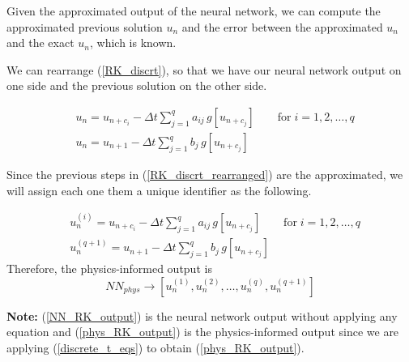 \documentclass[a4paper,12pt]{article}
\theoremstyle{definition}
\begin{document}
Given the approximated output of the neural network, we can compute the ap\-prox\-i\-mat\-ed previous solution 
$u_{n}$ and the error between the approximated $u_n$ and the exact $u_n$, which is known.

We can rearrange (\ref{RK_discrt}), so that we have our neural network output on one side and the 
previous solution on the other side.

\begin{equation}\label{RK_discrt_rearranged}
\begin{aligned}
& u_n = u_{n+c_i} -  \Delta t \sum_{j=1}^{q} a_{ij} \, g[u_{n+c_j}] 
\qquad \text{for} \; i = 1, 2, \dots, q \\
& u_n = u_{n+1} - \Delta t \sum_{j=1}^{q} b_j \, g[u_{n+c_j}] 
\end{aligned}
\end{equation}

Since the previous steps in (\ref{RK_discrt_rearranged}) are the approximated, we will assign each one 
them a unique identifier as the following.

\begin{equation}\label{discrete_t_eqs}
\begin{aligned}
& u_n^{(i)} = u_{n+c_i} -  \Delta t \sum_{j=1}^{q} a_{ij} \, g[u_{n+c_j}] 
\qquad \text{for} \; i = 1, 2, \dots, q \\
& u_n^{(q+1)} = u_{n+1} - \Delta t \sum_{j=1}^{q} b_j \, g[u_{n+c_j}] 
\end{aligned}
\end{equation}
Therefore, the physics-informed output is 
\begin{equation}\label{phys_RK_output}
NN_{phys} \rightarrow [u_{n}^{(1)}, u_n^{(2)}, \dots, u_n^{(q)}, u_n^{(q+1)}]
\end{equation}

\textbf{Note:} (\ref{NN_RK_output}) is the neural network output without applying any equation 
and (\ref{phys_RK_output}) is the physics-informed output since we are applying (\ref{discrete_t_eqs})
to obtain (\ref{phys_RK_output}). 
\end{document}
